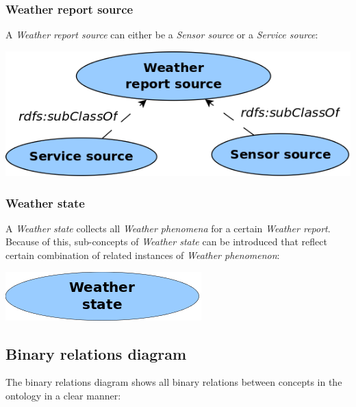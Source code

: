 \subsubsection{Weather report source}

A \emph{Weather report source} can either be a \emph{Sensor source} or a \emph{Service source}:

\begin{center}
  \includegraphics[scale=.3]{figures/diagrams/weather-report-source.png}
\end{center}

\subsubsection{Weather state}

A \emph{Weather state} collects all \emph{Weather phenomena} for a certain \emph{Weather report}. Because of this, sub-concepts of \emph{Weather state} can be introduced that reflect certain combination of related instances of \emph{Weather phenomenon}:

\begin{center}
  \includegraphics[scale=.3]{figures/diagrams/weather-state.png}
\end{center}

\subsection{Binary relations diagram}
\label{sec:binary_relations_diagram}

The binary relations diagram shows all binary relations between concepts in the ontology in a clear manner:

